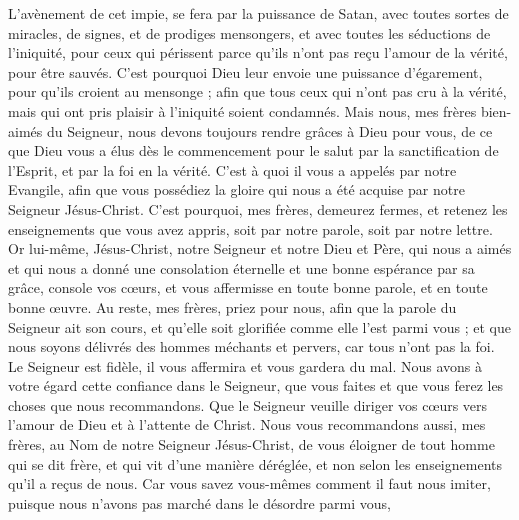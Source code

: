 \begin{multicols}{2}
L'avènement de cet impie, se fera par la puissance de Satan, avec toutes sortes de miracles, de signes, et de prodiges mensongers,
et avec toutes les séductions de l'iniquité, pour ceux qui périssent parce qu'ils n'ont pas reçu l'amour de la vérité, pour être sauvés.
C'est pourquoi Dieu leur envoie une puissance d'égarement, pour qu'ils croient au mensonge ;
afin que tous ceux qui n'ont pas cru à la vérité, mais qui ont pris plaisir à l'iniquité soient condamnés.
Mais nous, mes frères bien-aimés du Seigneur, nous devons toujours rendre grâces à Dieu pour vous, de ce que Dieu vous a élus dès le commencement pour le salut par la sanctification de l'Esprit, et par la foi en la vérité.
C'est à quoi il vous a appelés par notre Evangile, afin que vous possédiez la gloire qui nous a été acquise par notre Seigneur Jésus-Christ.
C'est pourquoi, mes frères, demeurez fermes, et retenez les enseignements que vous avez appris, soit par notre parole, soit par notre lettre.
Or lui-même, Jésus-Christ, notre Seigneur et notre Dieu et Père, qui nous a aimés et qui nous a donné une consolation éternelle et une bonne espérance par sa grâce,
console vos cœurs, et vous affermisse en toute bonne parole, et en toute bonne œuvre.
\VerseOne{}Au reste, mes frères, priez pour nous, afin que la parole du Seigneur ait son cours, et qu'elle soit glorifiée comme elle l'est parmi vous ;
et que nous soyons délivrés des hommes méchants et pervers, car tous n'ont pas la foi.
Le Seigneur est fidèle, il vous affermira et vous gardera du mal.
Nous avons à votre égard cette confiance dans le Seigneur, que vous faites et que vous ferez les choses que nous recommandons.
Que le Seigneur veuille diriger vos cœurs vers l'amour de Dieu et à l'attente de Christ.
Nous vous recommandons aussi, mes frères, au Nom de notre Seigneur Jésus-Christ, de vous éloigner de tout homme qui se dit frère, et qui vit d'une manière déréglée, et non selon les enseignements qu'il a reçus de nous.
Car vous savez vous-mêmes comment il faut nous imiter, puisque nous n'avons pas marché dans le désordre parmi vous,

\end{multicols}
